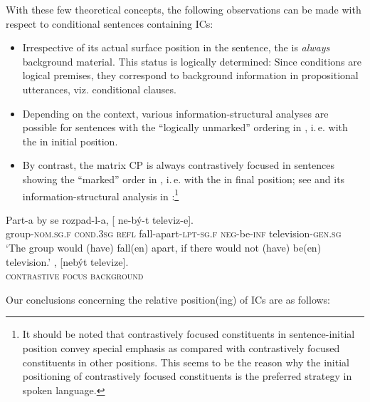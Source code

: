 \documentclass[output=paper,colorlinks,citecolor=brown,newtxmath]{langsci/langscibook}
\begin{document}
With these few theoretical concepts, the following observations can be made with respect to conditional sentences containing ICs:

\begin{itemize}

\item Irrespective of its actual surface position in the sentence, the  is \textit{always} background material. This status is logically determined: Since conditions are logical premises, they correspond to background information in propositional utterances, viz. conditional clauses.

\item Depending on the context, various information-structural analyses are possible for sentences with the ``logically unmarked'' ordering in , i.\,e. with the  in initial position.

\item By contrast, the matrix CP is always contrastively focused in sentences showing the ``marked'' order in , i.\,e. with the  in final position; see  and its information-structural analysis in :\footnote{It should be noted that contrastively focused constituents in sentence-initial position convey special emphasis as compared with contrastively focused constituents in other positions. This seems to be the reason why the initial positioning of contrastively focused constituents is the preferred strategy in spoken language.}

\end{itemize}

\ea\label{ex:television}
\ea\label{ex:television-a}
\gll Part-a by se rozpad-l-a, [\hspace{-2pt} ne-bý-t televiz-e].\\
     group-\textsc{nom.sg.f} \textsc{cond.3sg} \textsc{refl} {fall-apart}-\textsc{lpt-sg.f} {} \textsc{neg}-be-\textsc{inf} television-\textsc{gen.sg}\\
\glt `The group would (have) fall(en) apart, if there would not (have) be(en) television.' \hfill \citep[;][4]{Milotova2012}
\ex\label{ex:television-b}
, {[nebýt televize].}\\
	{\textsc{contrastive focus}}	{\textsc{background}}\\
\z
\z

\noindent Our conclusions concerning the relative position(ing) of ICs are as follows:
\end{document}
